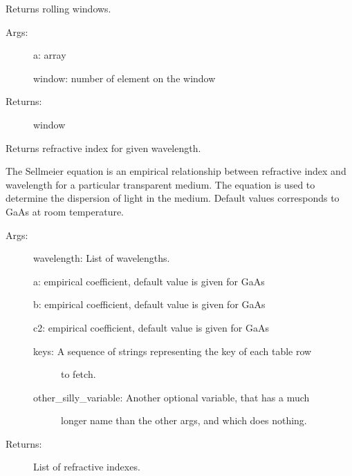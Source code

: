 \documentclass[letterpaper,10pt,english]{sphinxmanual}
\begin{document}

\begin{fulllineitems}
\label{\detokenize{GUI:GUI.rolling_window}}
Returns rolling windows.
\begin{description}
\item[{Args:}] \leavevmode
a: array

window: number of element on the window

\item[{Returns:}] \leavevmode
window

\end{description}

\end{fulllineitems}


\begin{fulllineitems}
\label{\detokenize{GUI:GUI.sellmeyer_eq}}
Returns refractive index for given wavelength.

The Sellmeier equation is an empirical relationship between refractive 
index and wavelength for a particular transparent medium. 
The equation is used to determine the dispersion of light
in the medium. Default values corresponds to GaAs at room
temperature.
\begin{description}
\item[{Args:}] \leavevmode
wavelength: List of wavelengths.

a: empirical coefficient, default value is given for GaAs

b: empirical coefficient, default value is given for GaAs

c2: empirical coefficient, default value is given for GaAs
\begin{description}
\item[{keys: A sequence of strings representing the key of each table row}] \leavevmode
to fetch.

\item[{other\_silly\_variable: Another optional variable, that has a much}] \leavevmode
longer name than the other args, and which does nothing.

\end{description}

\item[{Returns:}] \leavevmode
List of refractive indexes.

\end{description}

\end{fulllineitems}
\end{document}
